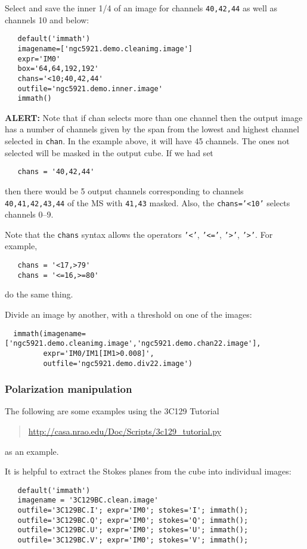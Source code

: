     
Select and save the inner 1/4 of an image for channels {\tt 40,42,44}
as well as channels 10 and below:
\small
\begin{verbatim}
   default('immath')
   imagename=['ngc5921.demo.cleanimg.image']
   expr='IM0'
   box='64,64,192,192'
   chans='<10;40,42,44'
   outfile='ngc5921.demo.inner.image'
   immath()
\end{verbatim}
\normalsize
{\bf ALERT:} Note that if chan selects more than one channel then
the output image has a number of channels given by the span from the
lowest and highest channel selected in {\tt chan}.  In the example 
above, it will have 45 channels.  The ones not selected will be masked
in the output cube.  If we had set
\small
\begin{verbatim}
   chans = '40,42,44'
\end{verbatim}
\normalsize
then there would be 5 output channels corresponding to channels
{\tt 40,41,42,43,44} of the MS with {\tt 41,43} masked.  Also, 
the {\tt chans='<10'} selects channels 0--9.

Note that the {\tt chans} syntax allows the operators {\tt '<'},
{\tt '<='}, {\tt '>'}, {\tt '>'}.  For example,
\small
\begin{verbatim}
   chans = '<17,>79'
   chans = '<=16,>=80'
\end{verbatim}
\normalsize
do the same thing.

Divide an image by another, with a threshold on one of the images:
\small
\begin{verbatim}
  immath(imagename=['ngc5921.demo.cleanimg.image','ngc5921.demo.chan22.image'],
         expr='IM0/IM1[IM1>0.008]',
         outfile='ngc5921.demo.div22.image')
\end{verbatim}
\normalsize

\subsubsection{Polarization manipulation}
\label{section:analysis.immath.examples.pol}

The following are some examples using the 3C129 Tutorial
\begin{quote}
  \url{http://casa.nrao.edu/Doc/Scripts/3c129_tutorial.py}
\end{quote}
as an example.

It is helpful to extract the Stokes planes from the cube
into individual images:
\small
\begin{verbatim}
   default('immath')
   imagename = '3C129BC.clean.image'
   outfile='3C129BC.I'; expr='IM0'; stokes='I'; immath();
   outfile='3C129BC.Q'; expr='IM0'; stokes='Q'; immath();
   outfile='3C129BC.U'; expr='IM0'; stokes='U'; immath();
   outfile='3C129BC.V'; expr='IM0'; stokes='V'; immath();
\end{verbatim}
\normalsize

